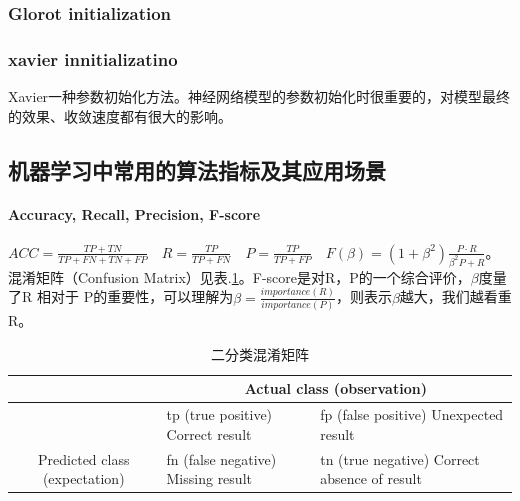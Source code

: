 \subsubsection{Glorot initialization}

\subsubsection{xavier innitializatino} 
Xavier\cite{pmlr-v9-glorot10a}一种参数初始化方法。神经网络模型的参数初始化时很重要的，对模型最终的效果、收敛速度都有很大的影响。


\subsection{机器学习中常用的算法指标及其应用场景}

\paragraph{Accuracy, Recall, Precision, F-score}

$ACC = \frac{TP + TN}{TP+FN+TN+FP}\quad R = \frac{TP}{TP+FN}\quad P = \frac{TP}{TP+FP}\quad F(\beta) = (1 + \beta^2)\frac{P \cdot R}{\beta^2 P + R}$。混淆矩阵（Confusion Matrix）见表.\ref{tab:confusion_mat}。F-score是对R，P的一个综合评价，$\beta$度量了R 相对于 P的重要性，可以理解为$\beta = \frac{importance(R) }{importance(P)}$，则表示$\beta$越大，我们越看重R。

\begin{table}[h]
	\centering
	\caption{二分类混淆矩阵}
	\label{tab:confusion_mat}
	\begin{tabular}{|c|l|l|}
		\hline
		\multicolumn{1}{|l|}{}                          & \multicolumn{2}{c|}{Actual class (observation)}                                                                                   \\ \hline
		& tp (true positive) Correct result                          & fp (false positive) Unexpected result                                \\ \cline{2-3} 
		\multirow{-2}{*}{Predicted class (expectation)} & \cellcolor[HTML]{68CBD0}fn (false negative) Missing result & \cellcolor[HTML]{68CBD0}tn (true negative) Correct absence of result \\ \hline
	\end{tabular}
\end{table}

